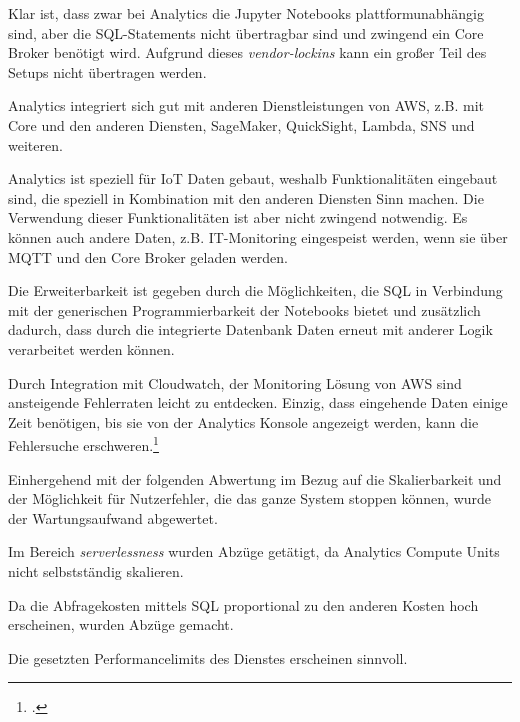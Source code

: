 Klar ist, dass zwar bei \AWSIOT{} Analytics die Jupyter Notebooks plattformunabhängig sind, aber die \ac{SQL}-Statements nicht übertragbar sind und zwingend ein \AWSIOT{} Core Broker benötigt wird. Aufgrund dieses \textit{vendor-lockins} kann ein großer Teil des Setups nicht übertragen werden.

\AWSIOT{} Analytics integriert sich gut mit anderen Dienstleistungen von AWS, z.B. mit \AWSIOT{} Core und den anderen \AWSIOT{} Diensten, SageMaker, QuickSight, Lambda, \ac{SNS} und weiteren.

\AWSIOT{} Analytics ist speziell für \ac{IoT} Daten gebaut, weshalb Funktionalitäten eingebaut sind, die speziell in Kombination mit den anderen \AWSIOT{} Diensten Sinn machen. Die Verwendung dieser Funktionalitäten ist aber nicht zwingend notwendig. Es können auch andere Daten, z.B. IT-Monitoring eingespeist werden, wenn sie über \ac{MQTT} und den \AWSIOT{} Core Broker geladen werden.

Die Erweiterbarkeit ist gegeben durch die Möglichkeiten, die \ac{SQL} in Verbindung mit der generischen Programmierbarkeit der Notebooks bietet und zusätzlich dadurch, dass durch die integrierte Datenbank Daten erneut mit anderer Logik verarbeitet werden können.

Durch Integration mit Cloudwatch, der Monitoring Lösung von \ac{AWS} sind ansteigende Fehlerraten leicht zu entdecken. Einzig, dass eingehende Daten einige Zeit benötigen, bis sie von der \AWSIOT{} Analytics Konsole angezeigt werden, kann die Fehlersuche erschweren.\footcite[Vgl.][]{AmazonWebServicesInc..o.J.aw}

Einhergehend mit der folgenden Abwertung im Bezug auf die Skalierbarkeit und der Möglichkeit für Nutzerfehler, die das ganze System stoppen können, wurde der Wartungsaufwand abgewertet.

Im Bereich \textit{serverlessness} wurden Abzüge getätigt, da Analytics Compute Units nicht selbstständig skalieren.

Da die Abfragekosten mittels \ac{SQL} proportional zu den anderen Kosten hoch erscheinen, wurden Abzüge gemacht.

Die gesetzten Performancelimits des Dienstes erscheinen sinnvoll.

